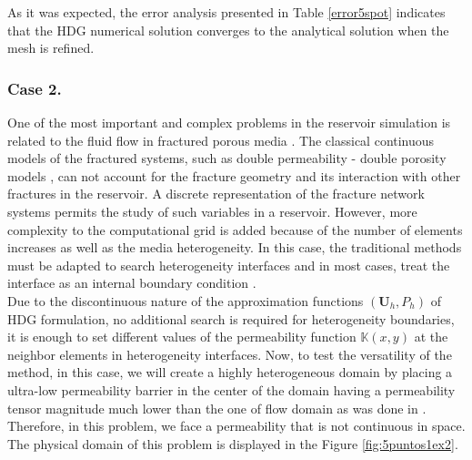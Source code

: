 \documentclass[review]{elsarticle}
\def\unn{\textbf{U}}
\begin{document}
As it was expected, the error analysis presented in Table \ref{error5spot} indicates that the HDG  numerical solution converges to the analytical solution when the mesh is refined.

\subsubsection{Case 2.}

One of the most important and complex problems in the reservoir simulation is related to the fluid flow in fractured porous media \cite{sahimi2011flow}. The classical continuous models of the fractured systems, such as double permeability - double porosity models \cite{fractureGhafouri96,fractureLewis97,fractureHuyakorn83}, can not account for the fracture geometry and its interaction with other fractures in the reservoir. A discrete representation of the fracture network systems permits the study of such variables in a reservoir. However, more complexity to the computational grid is added because of the number of elements increases as well as the media heterogeneity.  In this case, the traditional methods must be adapted to search heterogeneity interfaces and in most cases, treat the interface as an internal boundary condition \cite{bobaru2012}.\\
Due to the discontinuous nature of the approximation functions $(\unn_h,P_h)$ of HDG formulation, no additional search is required for heterogeneity boundaries, it is enough to set different values of the permeability function $\mathbb{K}(x,y)$ at the neighbor elements in heterogeneity interfaces. Now, to test the versatility of the method, in this case, we will create a highly heterogeneous domain by placing a ultra-low permeability barrier in the center of the domain having a permeability tensor magnitude much lower than the one of flow domain as was done in \cite{KATIYAR}. Therefore, in this problem, we face a permeability that is not continuous in space. The physical domain of this problem is displayed in the Figure \ref{fig:5puntos1ex2}.    
\end{document}

